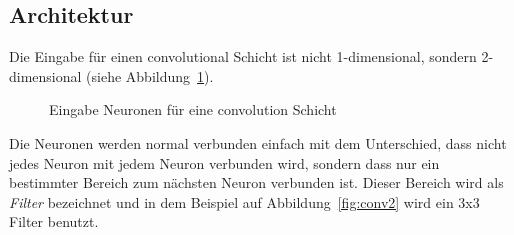 \documentclass[12pt,a4paper]{report}
\begin{document}
\subsection{Architektur}
Die Eingabe für einen convolutional Schicht ist nicht 1-dimensional, sondern 2-dimensional (siehe Abbildung~\ref{fig:conv1}).
\begin{figure}[h]
    \centering
{}
    \caption{Eingabe Neuronen für eine convolution Schicht}
    \label{fig:conv1}
\end{figure}
Die Neuronen werden normal verbunden einfach mit dem Unterschied, dass nicht jedes Neuron mit jedem Neuron verbunden wird,
sondern dass nur ein bestimmter Bereich zum nächsten Neuron verbunden ist.
Dieser Bereich wird als \textit{Filter} bezeichnet und in dem Beispiel auf Abbildung~\ref{fig:conv2} wird ein 3x3 Filter benutzt.
\end{document}
